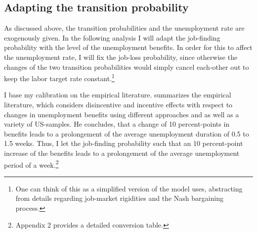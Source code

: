 \documentclass[a4paper,12pt]{article}
\begin{document}
\subsection{Adapting the transition probability}

As discussed above, the transition probabilities and the unemployment rate are exogenously given. In the following analysis I will adapt the job-finding probability with the level of the unemployment benefits. In order for this to affect the unemployment rate, I will fix the job-loss probability, since otherwise the changes of the two transition probabilities would simply cancel each-other out to keep the labor target rate constant.\footnote{One can think of this as a simplified version of the model \cite{mukoyama} uses, abstracting from details regarding job-market rigidities and the Nash bargaining process.} 

I base my calibration on the empirical literature. \citep{decker} summarizes the empirical literature, which considers disincentive and incentive effects with respect to changes in unemployment benefits using different approaches and as well as a variety of US-samples. He concludes, that a change of 10 percent-points in benefits leads to a prolongement of the average unemployment duration of 0.5 to 1.5 weeks. 
Thus, I let the job-finding probability such that an 10 percent-point increase of the benefits leads to a prolongement of the average unemployment period of a week.\footnote{Appendix 2 provides a detailed conversion table.}
\end{document}
